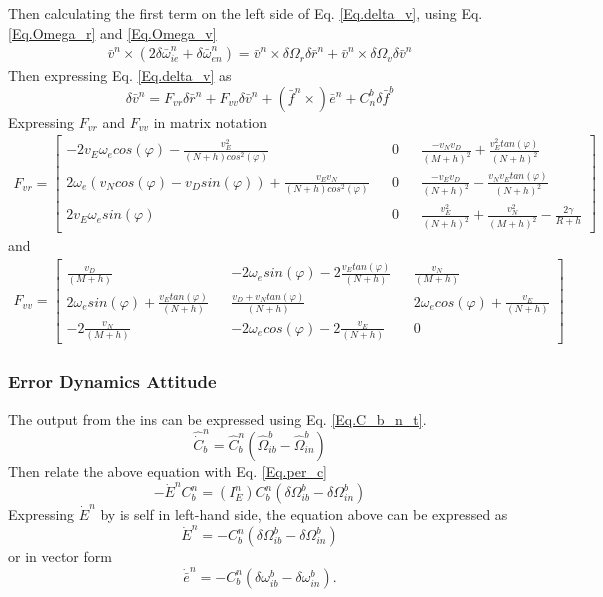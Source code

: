 Then calculating the first term on the left side of Eq. \eqref{Eq.delta_v}, using Eq. \eqref{Eq.Omega_r} and \eqref{Eq.Omega_v}
\begin{align}
\bar{v}^n\times(2\delta \bar{\omega}_{ie}^n+\delta \bar{\omega}_{en}^n) = 
\bar{v}^n \times \delta\Omega_r\delta\bar{r}^n +\bar{v}^n\times\delta\Omega_v\delta\bar{v}^n
\end{align}
Then expressing Eq. \eqref{Eq.delta_v} as
\begin{equation}
\delta\bar{v}^n = F_{vr}\delta\bar{r}^n + F_{vv}\delta\bar{v}^n + (\bar{f}^n	\times)\bar{e}^n + C_n^b\delta \bar{f}^b
\end{equation}
Expressing $F_{vr}$ and $F_{vv}$ in matrix notation
\begin{align}
F_{vr} = 
\begin{bmatrix}
-2v_E\omega_e cos(\varphi)-\frac{v_E^2}{(N+h)cos^2(\varphi)} && 0 && \frac{-v_N v_D}{(M+h)^2} + \frac{v_E^2 tan(\varphi)}{(N+h)^2} \\
2\omega_e(v_N cos(\varphi)-v_D sin(\varphi)) + \frac{v_Ev_N}{(N+h)cos^2(\varphi)} && 0 && \frac{-v_E v_D}{(N+h)^2} - \frac{v_Nv_E tan(\varphi)}{(N+h)^2} \\
2v_E\omega_e sin(\varphi) && 0 && \frac{v_E^2}{(N+h)^2} + \frac{v_N^2}{(M+h)^2} - \frac{2\gamma}{R+h}
\end{bmatrix}
\label{Eq.Fvr}
\end{align}
and
\begin{align}
F_{vv} = 
\begin{bmatrix}
\frac{v_D}{(M+h)} && -2\omega_e sin(\varphi) -2\frac{v_Etan(\varphi)}{(N+h)} && \frac{v_N}{(M+h)} \\
2\omega_e sin(\varphi) +\frac{v_E tan(\varphi)}{(N+h)} && \frac{v_D + v_N tan(\varphi)}{(N+h)} && 2\omega_e cos(\varphi)+ \frac{v_E}{(N+h)} \\
-2\frac{v_N}{(M+h)} && -2\omega_e cos(\varphi) -2\frac{v_E}{(N+h)} && 0
\end{bmatrix}
\label{Eq.Fvv}
\end{align}
\subsubsection{Error Dynamics Attitude}
The output from the \gls{ins} can be expressed using Eq. \eqref{Eq.C_b_n_t}.
\begin{equation}
\hat{\dot{C}}_b^n = \hat{C}_b^n(\hat{\Omega}_{ib}^b - \hat{\Omega}_{in}^b)
\end{equation}
Then relate the above equation with Eq. \eqref{Eq.per_c}
\begin{equation}
-\dot{E}^nC_b^n = (I_E^n)C_b^n(\delta\Omega_{ib}^b-\delta\Omega_{in}^b)
\end{equation}
Expressing $\dot{E}^n$ by is self in left-hand side, the equation above can be expressed as
\begin{equation}
\dot{E}^n = -C_b^n(\delta\Omega_{ib}^b-\delta\Omega_{in}^b)
\end{equation}
or in vector form
\begin{equation}
\dot{\bar{e}}^n = -C_b^n(\delta\omega_{ib}^b-\delta\omega_{in}^b).
\label{Eq.error_vec}
\end{equation}

